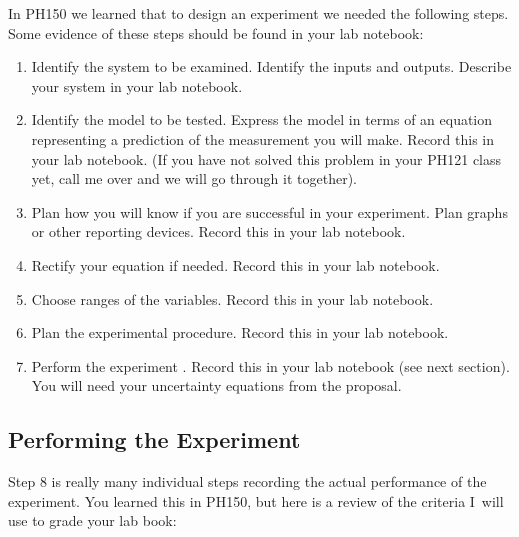 In PH150 we learned that to design an experiment we needed the following
steps. Some evidence of these steps should be found in your lab notebook:

\begin{enumerate}
\item Identify the system to be examined. Identify the inputs and outputs.
Describe your system in your lab notebook.

\item Identify the model to be tested. Express the model in terms of an
equation representing a prediction of the measurement you will make. Record
this in your lab notebook. (If you have not solved this problem in your
PH121 class yet, call me over and we will go through it together).

\item Plan how you will know if you are successful in your experiment. Plan
graphs or other reporting devices. Record this in your lab notebook.

\item Rectify your equation if needed. Record this in your lab notebook.

\item Choose ranges of the variables. Record this in your lab notebook.

\item Plan the experimental procedure. Record this in your lab notebook.

\item Perform the experiment . Record this in your lab notebook (see next
section). You will need your uncertainty equations from the proposal.
\end{enumerate}

\subsection{Performing the Experiment}

Step 8 is really many individual steps recording the actual performance of
the experiment. You learned this in PH150, but here is a review of the
criteria I\ will use to grade your lab book:

